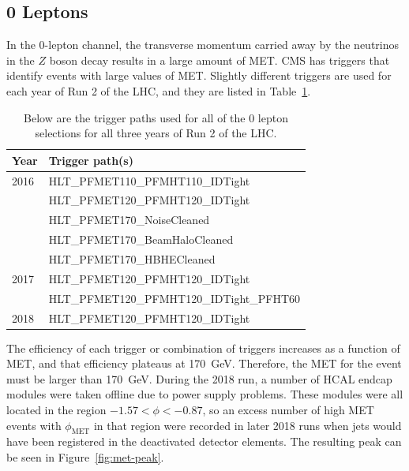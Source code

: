 \subsection{0 Leptons} \label{sec:resolved-0}

In the 0-lepton channel, the transverse momentum carried away by the neutrinos
in the $Z$ boson decay results in a large amount of MET.
CMS has triggers that identify events with large values of MET.
Slightly different triggers are used for each year of Run 2 of the LHC,
and they are listed in Table~\ref{tab:0-triggers}.
\begin{table}
  \centering
  \caption[Triggers for the 0 lepton selection]{
    Below are the trigger paths used for all of the 0 lepton selections
    for all three years of Run 2 of the LHC.
  }
  \begin{tabular}{|l|l|}
    \hline
    Year & Trigger path(s) \\
    \hline
    2016 & HLT\_PFMET110\_PFMHT110\_IDTight \\
    & HLT\_PFMET120\_PFMHT120\_IDTight \\
    & HLT\_PFMET170\_NoiseCleaned \\
    & HLT\_PFMET170\_BeamHaloCleaned \\
    & HLT\_PFMET170\_HBHECleaned \\
    \hline
    2017 & HLT\_PFMET120\_PFMHT120\_IDTight \\
    & HLT\_PFMET120\_PFMHT120\_IDTight\_PFHT60 \\
    \hline
    2018 & HLT\_PFMET120\_PFMHT120\_IDTight \\
    \hline
  \end{tabular}
  \label{tab:0-triggers}
\end{table}
The efficiency of each trigger or combination of triggers increases as a function of MET,
and that efficiency plateaus at \SI{170}{GeV}.
Therefore, the MET for the event must be larger than \SI{170}{GeV}.
During the 2018 run, a number of HCAL endcap modules were taken offline
due to power supply problems.
These modules were all located in the region $-1.57 < \phi < -0.87$,
so an excess number of high MET events with $\phi_\mathrm{MET}$ in that region were recorded
in later 2018 runs when jets would have been registered in the deactivated detector elements.
The resulting peak can be seen in Figure~\ref{fig:met-peak}.
